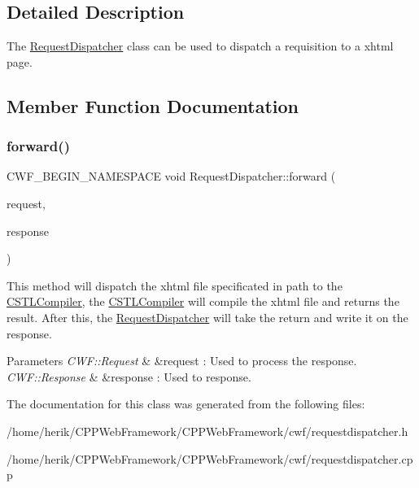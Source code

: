\subsection{Detailed Description}
The \hyperlink{class_request_dispatcher}{Request\+Dispatcher} class can be used to dispatch a requisition to a xhtml page. 

\subsection{Member Function Documentation}
\mbox{\label{class_request_dispatcher_a6416fc9441670d1de84b3c8262d13220}} 
\subsubsection{\texorpdfstring{forward()}{forward()}}
{\footnotesize\ttfamily C\+W\+F\+\_\+\+B\+E\+G\+I\+N\+\_\+\+N\+A\+M\+E\+S\+P\+A\+CE void Request\+Dispatcher\+::forward (\begin{DoxyParamCaption}\item[{C\+W\+F\+::\+Request \&}]{request,  }\item[{C\+W\+F\+::\+Response \&}]{response }\end{DoxyParamCaption})}



This method will dispatch the xhtml file specificated in path to the \hyperlink{class_c_s_t_l_compiler}{C\+S\+T\+L\+Compiler}, the \hyperlink{class_c_s_t_l_compiler}{C\+S\+T\+L\+Compiler} will compile the xhtml file and returns the result. After this, the \hyperlink{class_request_dispatcher}{Request\+Dispatcher} will take the return and write it on the response. 


\begin{DoxyParams}{Parameters}
{\em C\+W\+F\+::\+Request} & \&request \+: Used to process the response. \\
\hline
{\em C\+W\+F\+::\+Response} & \&response \+: Used to response. \\
\hline
\end{DoxyParams}


The documentation for this class was generated from the following files\+:\begin{DoxyCompactItemize}
\item 
/home/herik/\+C\+P\+P\+Web\+Framework/\+C\+P\+P\+Web\+Framework/cwf/requestdispatcher.\+h\item 
/home/herik/\+C\+P\+P\+Web\+Framework/\+C\+P\+P\+Web\+Framework/cwf/requestdispatcher.\+cpp\end{DoxyCompactItemize}
